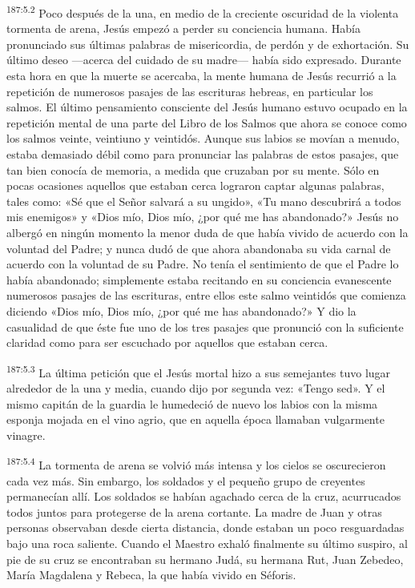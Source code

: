 \par 
\textsuperscript{187:5.2} Poco después de la una, en medio de la creciente oscuridad de la violenta tormenta de arena, Jesús empezó a perder su conciencia humana. Había pronunciado sus últimas palabras de misericordia, de perdón y de exhortación. Su último deseo ---acerca del cuidado de su madre--- había sido expresado. Durante esta hora en que la muerte se acercaba, la mente humana de Jesús recurrió a la repetición de numerosos pasajes de las escrituras hebreas, en particular los salmos. El último pensamiento consciente del Jesús humano estuvo ocupado en la repetición mental de una parte del Libro de los Salmos que ahora se conoce como los salmos veinte, veintiuno y veintidós. Aunque sus labios se movían a menudo, estaba demasiado débil como para pronunciar las palabras de estos pasajes, que tan bien conocía de memoria, a medida que cruzaban por su mente. Sólo en pocas ocasiones aquellos que estaban cerca lograron captar algunas palabras, tales como: «Sé que el Señor salvará a su ungido», «Tu mano descubrirá a todos mis enemigos» y «Dios mío, Dios mío, ¿por qué me has abandonado?» Jesús no albergó en ningún momento la menor duda de que había vivido de acuerdo con la voluntad del Padre; y nunca dudó de que ahora abandonaba su vida carnal de acuerdo con la voluntad de su Padre. No tenía el sentimiento de que el Padre lo había abandonado; simplemente estaba recitando en su conciencia evanescente numerosos pasajes de las escrituras, entre ellos este salmo veintidós que comienza diciendo «Dios mío, Dios mío, ¿por qué me has abandonado?» Y dio la casualidad de que éste fue uno de los tres pasajes que pronunció con la suficiente claridad como para ser escuchado por aquellos que estaban cerca.

\par 
\textsuperscript{187:5.3} La última petición que el Jesús mortal hizo a sus semejantes tuvo lugar alrededor de la una y media, cuando dijo por segunda vez: «Tengo sed». Y el mismo capitán de la guardia le humedeció de nuevo los labios con la misma esponja mojada en el vino agrio, que en aquella época llamaban vulgarmente vinagre.

\par 
\textsuperscript{187:5.4} La tormenta de arena se volvió más intensa y los cielos se oscurecieron cada vez más. Sin embargo, los soldados y el pequeño grupo de creyentes permanecían allí. Los soldados se habían agachado cerca de la cruz, acurrucados todos juntos para protegerse de la arena cortante. La madre de Juan y otras personas observaban desde cierta distancia, donde estaban un poco resguardadas bajo una roca saliente. Cuando el Maestro exhaló finalmente su último suspiro, al pie de su cruz se encontraban su hermano Judá, su hermana Rut, Juan Zebedeo, María Magdalena y Rebeca, la que había vivido en Séforis.

